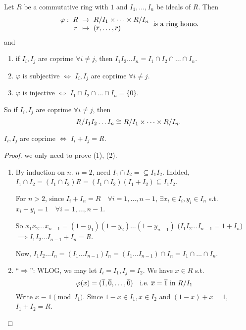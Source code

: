 \begin{theorem}
  Let $R$ be a commutative ring with $1$ and $I_1, \dots, I_n$ be ideals of $R$.
  Then
  \[
    \arraycolsep=3pt
    \begin{array}{rccl}
      \varphi: & R & \to & \quot{R}{I_1} \times \dots \times \quot{R}{I_n} \\
               & r & \mapsto & (\ob{r}, \dots, \ob{r})
    \end{array}
    \text{~is a ring homo.}
  \]
  and
  \begin{enumerate}[(1)]
    \item if $I_i, I_j$ are coprime $\forall i \ne j$, then
      $I_1I_2\dots I_n = I_1 \cap I_2 \cap \dots \cap I_n$.
    \item $\varphi$ is subjective $\iff$ $I_i, I_j$ are coprime
      $\forall i \ne j$.
    \item $\varphi$ is injective $\iff$ $I_1 \cap I_2 \cap \dots \cap I_n
      = \{ 0 \}$.
  \end{enumerate}
  So if $I_i, I_j$ are coprime $\forall i \ne j$, then
  \[
    {R}/{I_1I_2\dots I_n} \cong
    {R}/{I_1} \times \dots \times {R}/{I_n}.
  \]

  $I_i, I_j$ are coprime $\iff$ $I_i + I_j = R$.

  \begin{proof}
    we only need to prove (1), (2).

    \begin{enumerate}[(1)]
      \item By induction on $n$. $n = 2$, need $I_1\cap I_2 = \subseteq I_1I_2$.
        Indded, $I_1\cap I_2 = (I_1\cap I_2)R = (I_1\cap I_2)(I_1+I_2)
        \subseteq I_1I_2$.

        For $n > 2$, since $I_i + I_n = R \quad \forall i = 1,\dots, n-1$,
        $\exists x_i \in I_i, y_i \in I_n$ s.t. $x_i + y_i = 1 \quad
        \forall i = 1,\dots, n-1$.

        So $x_1x_2\dots x_{n-1} = (1-y_1)(1-y_2)\dots(1-y_{n-1})$
        ($I_1I_2\dots I_{n-1} = 1 + I_n$) $\implies I_1I_2\dots I_{n-1}
        + I_n = R$.

        Now, $I_1I_2\dots I_n = (I_1\dots I_{n-1})I_n =
        (I_1\dots I_{n-1})\cap I_n = I_1\cap \dots \cap I_n$.
      \item ``$\Rightarrow$'': WLOG, we may let $I_i = I_1, I_j = I_2$.
        We have $x \in R$ s.t.
        \[
          \varphi(x) = (\overline{1}, \overline{0}, \dots, \overline{0})
          \quad \text{i.e.~}
          \overline{x} = \overline{1} \text{~in~} {R}/{I_1}
        \]
        Write $x \equiv 1 \pmod {I_1}$.
        Since $1 - x \in I_1, x \in I_2$ and $(1 - x) + x = 1$, $I_1 + I_2 = R$.


\end{enumerate}
\end{proof}
\end{theorem}
